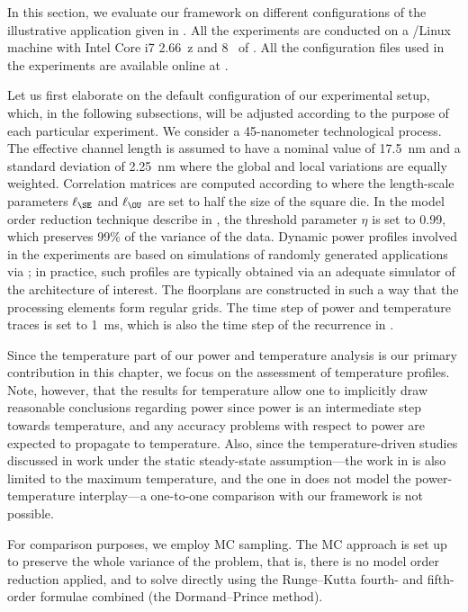 In this section, we evaluate our framework on different configurations of the
illustrative application given in . All the experiments
are conducted on a /Linux machine with Intel Core i7 2.66~z and
8~ of . All the configuration files used in the experiments are
available online at \cite{eslab2014b}.

Let us first elaborate on the default configuration of our experimental setup,
which, in the following subsections, will be adjusted according to the purpose
of each particular experiment. We consider a 45-nanometer technological process.
The effective channel length is assumed to have a nominal value of 17.5~nm
\cite{ptm} and a standard deviation of 2.25~nm where the global and local
variations are equally weighted. Correlation matrices are computed according to
 where the length-scale parameters $\ell_\SE$ and
$\ell_\OU$ are set to half the size of the square die. In the model order
reduction technique describe in , the threshold
parameter $\eta$ is set to 0.99, which preserves 99\% of the variance of the
data. Dynamic power profiles involved in the experiments are based on
simulations of randomly generated applications via \cite{dick1998}; in practice,
such profiles are typically obtained via an adequate simulator of the
architecture of interest. The floorplans are constructed in such a way that the
processing elements form regular grids. The time step of power and temperature
traces is set to 1~ms, which is also the time step of the recurrence in
.

Since the temperature part of our power and temperature analysis is our primary
contribution in this chapter, we focus on the assessment of temperature
profiles. Note, however, that the results for temperature allow one to
implicitly draw reasonable conclusions regarding power since power is an
intermediate step towards temperature, and any accuracy problems with respect to
power are expected to propagate to temperature. Also, since the
temperature-driven studies \cite{juan2011, juan2012, huang2009a, lee2013}
discussed in  work under the static steady-state
assumption---the work in \cite{juan2011} is also limited to the maximum
temperature, and the one in \cite{huang2009a} does not model the
power-temperature interplay---a one-to-one comparison with our framework is not
possible.

For comparison purposes, we employ \ac{MC} sampling. The \ac{MC} approach is set
up to preserve the whole variance of the problem, that is, there is no model
order reduction applied, and to solve  directly
using the Runge--Kutta fourth- and fifth-order formulae combined (the
Dormand--Prince method).


